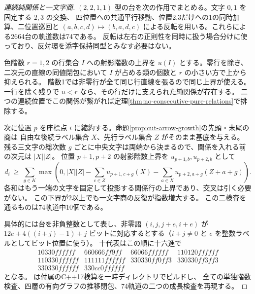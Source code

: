 \begin{proof}[連続純関係と一文字商]
$(2,2,1,1)$ 型の台を次の作用でまとめる。文字 $0,1$ を固定する $2,3$ の交換、
四位置への共通平行移動、位置2,3だけへの1の同時加算、二位置巡回と
$(a,b,c,d)\mapsto(b,a,d,c)$ による反転を用いる。これらによる2664台の軌道数は74である。
反転は左右の正則性を同時に扱う場合分けに使っており、反対環を添字保持同型とみなす必要はない。

色階数 $r=1,2$ の行集合 $I$ への射影階数の上界を $u(I)$ とする。零行を除き、
二次元の直線の同値閉包において $I$ が占める類の個数と $r$ の小さい方で上から抑えられる。
階数1では非零行が全て同じ行直線を張るので同じ上界が使える。
一行を除く残りで $u<r$ なら、その行だけに支えられた純関係が存在する。
二つの連続位置でこの関係が繋がれば定理\ref{thm:no-consecutive-pure-relations}で排除する。

次に位置 $p$ を座標点 $i$ に縮約する。命題\ref{prop:cut-arrow-growth}の先頭・末尾の商は
自由な後続ラベル集合 $X$、先行ラベル集合 $Z$ がそのまま基底を与える。
残る三文字の総次数 $g$ ごとに中央文字は両端から決まるので、関係を入れる前の次元は $|X||Z|$。
位置 $p+1,p+2$ の射影階数上界を $u_{p+1,b},u_{p+2,b}$ として
\[
 d_i\ \ge\ \sum_{g\in K}\max\left(0,|X||Z|-
     \sum_{c\in Z}u_{p+1,c+g}(X)-
     \sum_{a\in X}u_{p+2,a+g}(Z+a+g)\right).
\]
各和はもう一端の文字を固定して投影する関係行の上界であり、交叉は引く必要がない。
この下界が2以上でも一文字商の反復が指数増大する。
この二検査を通るものは74軌道中10個である。

具体的には台を非負整数として表し、非零語 $(i,j,j+e,i+e)$ が
$12e+4((i+j)-1)+j$ ビットに対応するとする（$i+j\ne0$ と $e$ を整数ラベルとしてビット位置に使う）。
十代表はこの順に十六進で
\[
\begin{array}{llll}
10330ffffff&660666ff9ff&66066ffffff&110120ffffff\\
110330ffffff&111111ffffff&330330ff0ff3&330330ff3ff3\\
330330ffffff&330cc0ffffff&&
\end{array}
\]
となる。 は付属のC++17検算を一時ディレクトリでビルドし、
全ての単独階数検査、四層の有向グラフの推移閉包、74軌道の二つの成長検査を再現する。
\end{proof}
